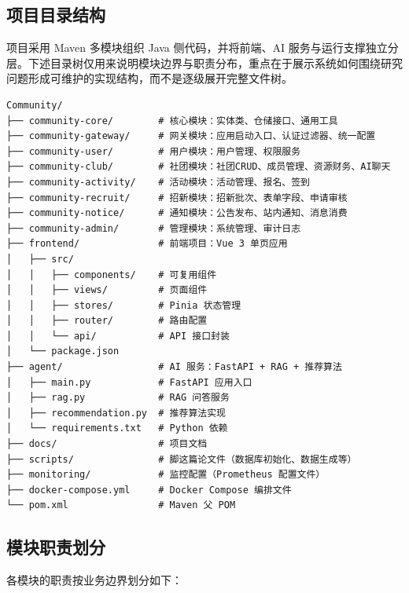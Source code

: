 \subsection{项目目录结构}

项目采用 Maven 多模块组织 Java 侧代码，并将前端、AI 服务与运行支撑独立分层。下述目录树仅用来说明模块边界与职责分布，重点在于展示系统如何围绕研究问题形成可维护的实现结构，而不是逐级展开完整文件树。

\begin{lstlisting}[caption=项目目录结构]
Community/
├── community-core/        # 核心模块：实体类、仓储接口、通用工具
├── community-gateway/     # 网关模块：应用启动入口、认证过滤器、统一配置
├── community-user/        # 用户模块：用户管理、权限服务
├── community-club/        # 社团模块：社团CRUD、成员管理、资源财务、AI聊天
├── community-activity/    # 活动模块：活动管理、报名、签到
├── community-recruit/     # 招新模块：招新批次、表单字段、申请审核
├── community-notice/      # 通知模块：公告发布、站内通知、消息消费
├── community-admin/       # 管理模块：系统管理、审计日志
├── frontend/              # 前端项目：Vue 3 单页应用
│   ├── src/
│   │   ├── components/    # 可复用组件
│   │   ├── views/         # 页面组件
│   │   ├── stores/        # Pinia 状态管理
│   │   ├── router/        # 路由配置
│   │   └── api/           # API 接口封装
│   └── package.json
├── agent/                 # AI 服务：FastAPI + RAG + 推荐算法
│   ├── main.py            # FastAPI 应用入口
│   ├── rag.py             # RAG 问答服务
│   ├── recommendation.py  # 推荐算法实现
│   └── requirements.txt   # Python 依赖
├── docs/                  # 项目文档
├── scripts/               # 脚这篇论文件（数据库初始化、数据生成等）
├── monitoring/            # 监控配置（Prometheus 配置文件）
├── docker-compose.yml     # Docker Compose 编排文件
└── pom.xml                # Maven 父 POM
\end{lstlisting}

\subsection{模块职责划分}

各模块的职责按业务边界划分如下：

